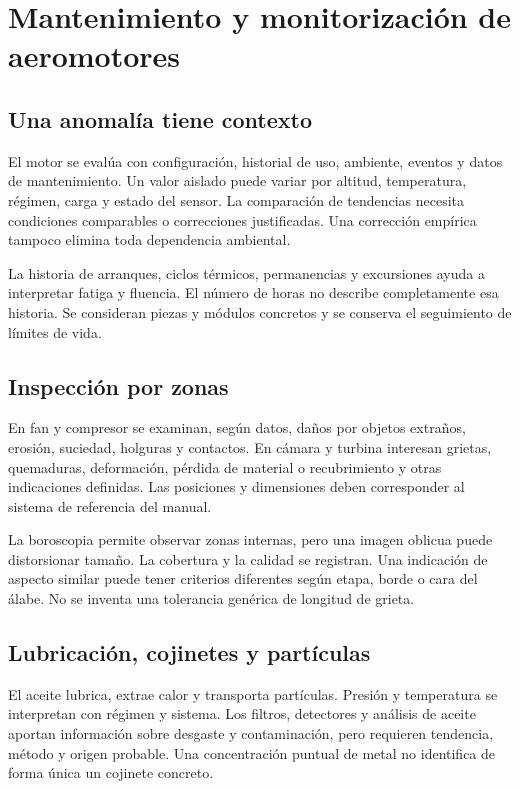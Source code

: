 \chapter{Mantenimiento y monitorización de aeromotores}\label{ch:22}
\section{Una anomalía tiene contexto}
El motor se evalúa con configuración, historial de uso, ambiente, eventos y datos de mantenimiento. Un valor aislado puede variar por altitud, temperatura, régimen, carga y estado del sensor. La comparación de tendencias necesita condiciones comparables o correcciones justificadas. Una corrección empírica tampoco elimina toda dependencia ambiental.

La historia de arranques, ciclos térmicos, permanencias y excursiones ayuda a interpretar fatiga y fluencia. El número de horas no describe completamente esa historia. Se consideran piezas y módulos concretos y se conserva el seguimiento de límites de vida.
\section{Inspección por zonas}
En fan y compresor se examinan, según datos, daños por objetos extraños, erosión, suciedad, holguras y contactos. En cámara y turbina interesan grietas, quemaduras, deformación, pérdida de material o recubrimiento y otras indicaciones definidas. Las posiciones y dimensiones deben corresponder al sistema de referencia del manual.

La boroscopia permite observar zonas internas, pero una imagen oblicua puede distorsionar tamaño. La cobertura y la calidad se registran. Una indicación de aspecto similar puede tener criterios diferentes según etapa, borde o cara del álabe. No se inventa una tolerancia genérica de longitud de grieta.
\section{Lubricación, cojinetes y partículas}
El aceite lubrica, extrae calor y transporta partículas. Presión y temperatura se interpretan con régimen y sistema. Los filtros, detectores y análisis de aceite aportan información sobre desgaste y contaminación, pero requieren tendencia, método y origen probable. Una concentración puntual de metal no identifica de forma única un cojinete concreto.

